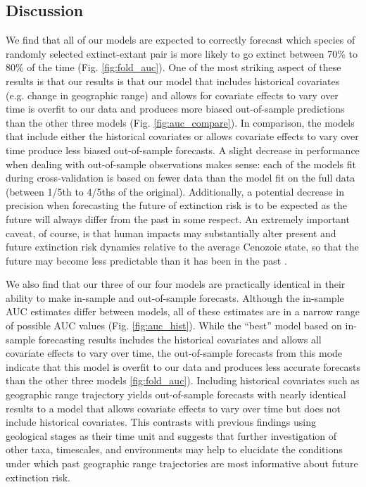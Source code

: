 \documentclass[12pt,letterpaper]{article}
\begin{document}
\begin{refsection}
\section{Discussion}

We find that all of our models are expected to correctly forecast which species of randomly selected extinct-extant pair is more likely to go extinct between 70\% to 80\% of the time (Fig. \ref{fig:fold_auc}). One of the most striking aspect of these results is that our results is that our model that includes historical covariates (e.g. change in geographic range) and allows for covariate effects to vary over time is overfit to our data and produces more biased out-of-sample predictions than the other three models (Fig. \ref{fig:auc_compare}). In comparison, the models that include either the historical covariates or allows covariate effects to vary over time produce less biased out-of-sample forecasts. A slight decrease in performance when dealing with out-of-sample observations makes sense: each of the models fit during cross-validation is based on fewer data than the model fit on the full data (between 1/5th to 4/5ths of the original). Additionally, a potential decrease in precision when forecasting the future of extinction risk is to be expected as the future will always differ from the past in some respect. An extremely important caveat, of course, is that human impacts may substantially alter present and future extinction risk dynamics relative to the average Cenozoic state, so that the future may become less predictable than it has been in the past \citep{Harnik2012a,Finnegan2015}.

We also find that our three of our four models are practically identical in their ability to make in-sample and out-of-sample forecasts. Although the in-sample AUC estimates differ between models, all of these estimates are in a narrow range of possible AUC values (Fig. \ref{fig:auc_hist}). While the ``best'' model based on in-sample forecasting results includes the historical covariates and allows all covariate effects to vary over time, the out-of-sample forecasts from this mode indicate that this model is overfit to our data and produces less accurate forecasts than the other three models \ref{fig:fold_auc}). Including historical covariates such as geographic range trajectory yields out-of-sample forecasts with nearly identical results to a model that allows covariate effects to vary over time but does not include historical covariates. This contrasts with previous findings using geological stages as their time unit \citep{Kiessling2016} and suggests that further investigation of other taxa, timescales, and environments may help to elucidate the conditions under which past geographic range trajectories are most informative about future extinction risk. 


\end{refsection}
\end{document}
